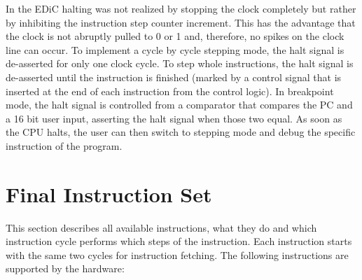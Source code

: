 In the \gls{EDiC} halting was not realized by stopping the clock completely but rather by inhibiting the instruction step counter increment.
This has the advantage that the clock is not abruptly pulled to 0 or 1 and, therefore, no spikes on the clock line can occur.
To implement a cycle by cycle stepping mode, the halt signal is de-asserted for only one clock cycle.
To step whole instructions, the halt signal is de-asserted until the instruction is finished (marked by a control signal that is inserted at the end of each instruction from the control logic).
In breakpoint mode, the halt signal is controlled from a comparator that compares the \gls{PC} and a 16 bit user input, asserting the halt signal when those two equal.
As soon as the \gls{CPU} halts, the user can then switch to stepping mode and debug the specific instruction of the program.

\section{Final Instruction Set}\label{sec:instructionSet}
This section describes all available instructions, what they do and which instruction cycle performs which steps of the instruction.
Each instruction starts with the same two cycles for instruction fetching.
The following instructions are supported by the hardware:

